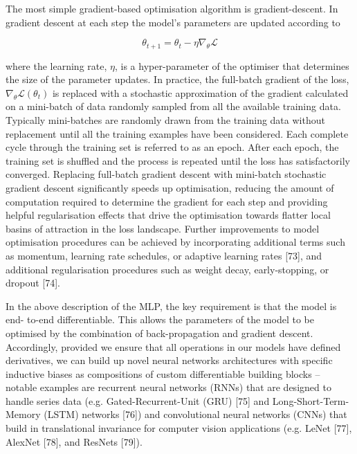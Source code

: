 The most simple gradient-based optimisation algorithm is gradient-descent. In gradient descent at each step the model’s parameters are updated according to

\begin{equation}
    \theta_{t+1} = \theta_t - \eta \nabla_{\theta} \mathcal{L}
\end{equation}

where the learning rate, $\eta$, is a hyper-parameter of the optimiser that determines the size of the parameter updates. In practice, the full-batch gradient of the loss, $\nabla_{\theta}\mathcal{L}(\theta_{t})$ is replaced with a stochastic approximation of the gradient calculated on a mini-batch of data randomly sampled from all the available training data. Typically mini-batches are randomly drawn from the training data without replacement until all the training examples have been considered. Each complete cycle through the training set is referred to as an epoch. After each epoch, the training set is shuffled and the process is repeated until the loss has satisfactorily converged. Replacing full-batch gradient descent with mini-batch stochastic gradient descent significantly speeds up optimisation, reducing the amount of computation required to determine the gradient for each step and providing helpful regularisation effects that drive the optimisation towards flatter local basins of attraction in the loss landscape. Further improvements to model optimisation procedures can be achieved by incorporating additional terms such as momentum, learning rate schedules, or adaptive learning rates [73], and additional regularisation procedures such as weight decay, early-stopping, or dropout [74].

In the above description of the MLP, the key requirement is that the model is end- to-end differentiable. This allows the parameters of the model to be optimised by the combination of back-propagation and gradient descent. Accordingly, provided we ensure that all operations in our models have defined derivatives, we can build up novel neural networks architectures with specific inductive biases as compositions of custom differentiable building blocks – notable examples are recurrent neural networks (RNNs) that are designed to handle series data (e.g. Gated-Recurrent-Unit (GRU) [75] and Long-Short-Term-Memory (LSTM) networks [76]) and convolutional neural networks
(CNNs) that build in translational invariance for computer vision applications (e.g. LeNet [77], AlexNet [78], and ResNets [79]).

